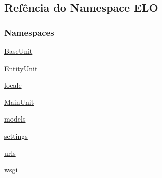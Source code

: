 \hypertarget{namespaceELO}{\subsection{Refência do Namespace E\-L\-O}
\label{namespaceELO}
}
\subsubsection*{Namespaces}
\begin{DoxyCompactItemize}
\item 
\hyperlink{namespaceELO_1_1BaseUnit}{Base\-Unit}
\item 
\hyperlink{namespaceELO_1_1EntityUnit}{Entity\-Unit}
\item 
\hyperlink{namespaceELO_1_1locale}{locale}
\item 
\hyperlink{namespaceELO_1_1MainUnit}{Main\-Unit}
\item 
\hyperlink{namespaceELO_1_1models}{models}
\item 
\hyperlink{namespaceELO_1_1settings}{settings}
\item 
\hyperlink{namespaceELO_1_1urls}{urls}
\item 
\hyperlink{namespaceELO_1_1wsgi}{wsgi}
\end{DoxyCompactItemize}
